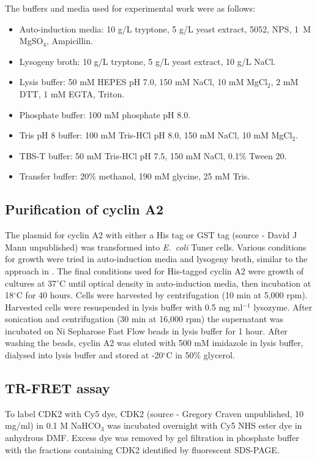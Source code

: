 The buffers and media used for experimental work were as follows:
\begin{itemize}
\item Auto-induction media: 10 g/L tryptone, 5 g/L yeast extract, 5052, NPS, 1~M MgSO$_{4}$, Ampicillin.
\item Lysogeny broth: 10 g/L tryptone, 5 g/L yeast extract, 10 g/L NaCl.
\item Lysis buffer: 50 mM HEPES pH 7.0, 150 mM NaCl, 10 mM MgCl$_{2}$, 2 mM DTT, 1 mM EGTA, Triton.
\item Phosphate buffer: 100 mM phosphate pH 8.0.
\item Tris pH 8 buffer: 100 mM Tris-HCl pH 8.0, 150 mM NaCl, 10 mM MgCl$_{2}$.
\item TBS-T buffer: 50 mM Tris-HCl pH 7.5, 150 mM NaCl, 0.1\% Tween 20.
\item Transfer buffer: 20\% methanol, 190 mM glycine, 25 mM Tris.
\end{itemize}


\subsection{Purification of cyclin A2}

The plasmid for cyclin A2 with either a His tag or GST tag (source - David J Mann unpublished) was transformed into \textit{E.\ coli} Tuner cells.
Various conditions for growth were tried in auto-induction media and lysogeny broth, similar to the approach in \cite{Wang2007}.
The final conditions used for His-tagged cyclin A2 were growth of cultures at 37$^{\circ}$C until optical density in auto-induction media, then incubation at 18$^{\circ}$C for 40 hours.
Cells were harvested by centrifugation (10 min at 5,000 rpm).
Harvested cells were resuspended in lysis buffer with 0.5 mg ml$^{-1}$ lysozyme.
After sonication and centrifugation (30 min at 16,000 rpm) the supernatant was incubated on Ni Sepharose Fast Flow beads in lysis buffer for 1 hour.
After washing the beads, cyclin A2 was eluted with 500 mM imidazole in lysis buffer, dialysed into lysis buffer and stored at -20$^{\circ}$C in 50\% glycerol.


\subsection{TR-FRET assay}

To label CDK2 with Cy5 dye, CDK2 (source - Gregory Craven unpublished, 10 mg/ml) in 0.1 M NaHCO$_{3}$ was incubated overnight with Cy5 NHS ester dye in anhydrous DMF.
Excess dye was removed by gel filtration in phosphate buffer with the fractions containing CDK2 identified by fluorescent SDS-PAGE.

